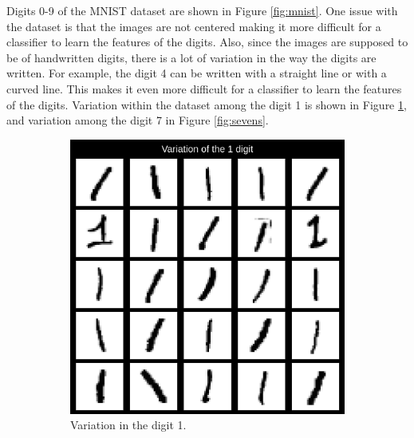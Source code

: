 \documentclass[12pt]{article}
\begin{document}
Digits 0-9 of the MNIST dataset are shown in Figure \ref{fig:mnist}. One issue with the dataset is that the images are not centered
making it more difficult for a classifier to learn the features of the digits. Also, since the images are supposed to be of handwritten
digits, there is a lot of variation in the way the digits are written. For example, the digit 4 can be written with a straight line or
with a curved line. This makes it even more difficult for a classifier to learn the features of the digits. Variation within the dataset
among the digit 1 is shown in Figure \ref{fig:ones}, and variation among the digit 7 in Figure \ref{fig:sevens}. \\
\begin{figure}[htbp]
    \centering
    \begin{subfigure}[b]{0.45\textwidth}
        \includegraphics[width=\textwidth]{ones.png}
        \caption{Variation in the digit 1.}
        \label{fig:ones}
    \end{subfigure}
    \hfill
    \begin{subfigure}[b]{0.45\textwidth}

\end{subfigure}
\end{figure}
\end{document}
